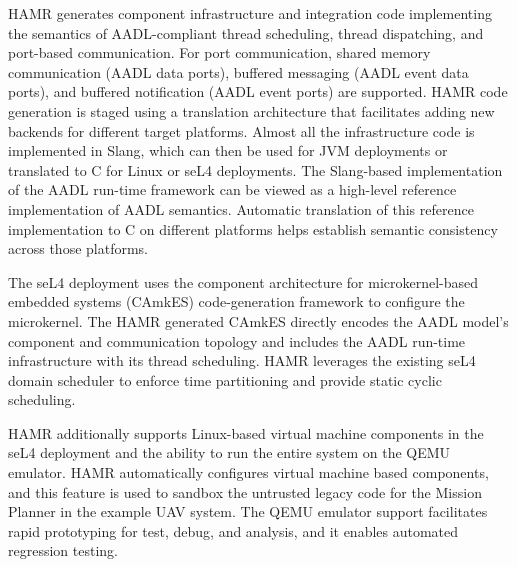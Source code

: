 HAMR generates component infrastructure and integration code
implementing the semantics of AADL-compliant thread scheduling,
thread dispatching, and port-based communication.
For port communication, shared memory communication (AADL
data ports), buffered messaging (AADL event data ports), and
buffered notification (AADL event ports) are supported.
HAMR code generation is staged using a translation architecture
that facilitates adding new backends for different target
platforms.   Almost all the infrastructure code is implemented
in Slang, which can then be used for JVM deployments or
translated to C for Linux or seL4 deployments.
The Slang-based implementation of the AADL run-time framework
can be viewed as a high-level reference implementation of AADL
semantics.   Automatic translation of this reference
implementation to C on different platforms helps establish
semantic consistency across those platforms. 

The seL4 deployment uses the component architecture for microkernel-based embedded systems
(CAmkES) code-generation framework to configure the microkernel.
The HAMR generated CAmkES directly encodes the AADL model's component and communication
topology and includes the AADL run-time infrastructure with its thread scheduling.
HAMR leverages the existing seL4 domain scheduler to enforce time partitioning and provide static cyclic scheduling.

HAMR additionally supports Linux-based virtual machine components in the seL4 deployment and the ability to run the entire system on the QEMU emulator.
HAMR automatically configures virtual machine based components, and this feature is used to sandbox the untrusted legacy code for the Mission Planner in the example UAV system.
The QEMU emulator support facilitates rapid prototyping for test, debug, and analysis, and it enables automated regression testing.



